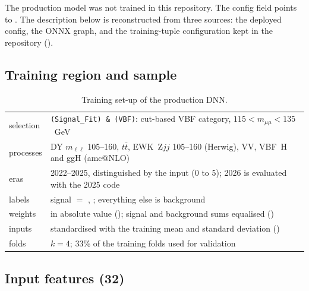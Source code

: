 \documentclass[11pt,a4paper]{article}
\begin{document}
The production model was not trained in this repository. The config field
 points to .
The description below is reconstructed from three sources: the deployed config,
the ONNX graph, and the training-tuple configuration kept in the repository
().

\subsection{Training region and sample}

\begin{table}[H]\centering\small
\begin{tabularx}{\textwidth}{lY}
\toprule
selection & \texttt{(Signal\_Fit) \& (VBF)}: cut-based VBF category, $115 < m_{\mu\mu} < 135$~GeV \\
processes & DY $m_{\ell\ell}$ 105--160, $t\bar t$, EWK~Z$jj$ 105--160 (Herwig), VV, VBF~H and ggH (amc@NLO) \\
eras & 2022--2025, distinguished by the input  (0 to 5); 2026 is evaluated with the 2025 code \\
labels & signal $=$ , ; everything else is background \\
weights &  in absolute value (); signal and background sums equalised () \\
inputs & standardised with the training mean and standard deviation () \\
folds & $k = 4$; 33\% of the training folds used for validation \\
\bottomrule
\end{tabularx}
\caption{Training set-up of the production DNN.}
\end{table}

\subsection{Input features (32)}
\end{document}
